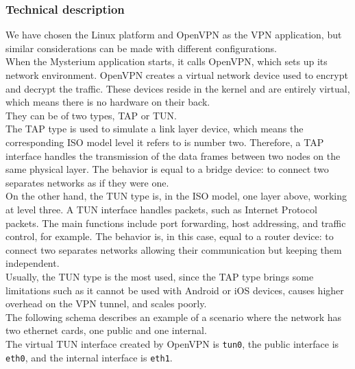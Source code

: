 \documentclass[12pt]{article}
\begin{document}
	\subsubsection{Technical description}
	We have chosen the Linux platform and OpenVPN as the VPN application, but similar considerations can be made with different configurations.\\
	When the Mysterium application starts, it calls OpenVPN, which sets up its network environment. OpenVPN creates a virtual network device used to encrypt and decrypt the traffic. These devices reside in the kernel and are entirely virtual, which means there is no hardware on their back.\\
	They can be of two types, TAP or TUN.\\
	The TAP type is used to simulate a link layer device, which means the corresponding ISO model level it refers to is number two. Therefore, a TAP interface handles the transmission of the data frames between two nodes on the same physical layer. The behavior is equal to a bridge device: to connect two separates networks as if they were one.\\
	On the other hand, the TUN type is, in the ISO model, one layer above, working at level three. A TUN interface handles packets, such as Internet Protocol packets. The main functions include port forwarding, host addressing, and traffic control, for example. The behavior is, in this case, equal to a router device: to connect two separates networks allowing their communication but keeping them independent.\\
	Usually, the TUN type is the most used, since the TAP type brings some limitations such as it cannot be used with Android or iOS devices, causes higher overhead on the VPN tunnel, and scales poorly.\\
	The following schema describes an example of a scenario where the network has two ethernet cards, one public and one internal.\\
	The virtual TUN interface created by OpenVPN is \lstinline{tun0}, the public interface is \lstinline{eth0}, and the internal interface is \lstinline{eth1}.\\
\end{document}
